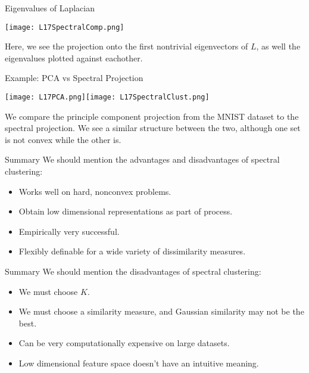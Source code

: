\documentclass[10pt, table, dvipsnames,xcdraw,handout]{beamer}
\begin{document}
\begin{frame}[fragile]{Eigenvalues of Laplacian}
  \begin{minipage}[t][0.7\textheight][t]{\textwidth}
	\centering \texttt{[image: L17SpectralComp.png]} 
  \end{minipage}
  \vfill
\begin{minipage}[t][0.3\textheight][t]{\textwidth}
Here, we see the projection onto the first nontrivial eigenvectors of $L$, as well the eigenvalues plotted against eachother. 
\end{minipage}
\end{frame}






\begin{frame}[fragile]{Example: PCA vs Spectral Projection}
  \begin{minipage}[t][0.7\textheight][t]{\textwidth}
	\centering \texttt{[image: L17PCA.png]}\texttt{[image: L17SpectralClust.png]} 
  \end{minipage}
  \vfill
\begin{minipage}[t][0.3\textheight][t]{\textwidth}
We compare the principle component projection from the MNIST dataset to the spectral projection. We see a similar structure between the two, although one set is not convex while the other is. 
\end{minipage}
\end{frame}



\begin{frame}[fragile]{Summary}
We should mention the advantages and disadvantages of spectral clustering:\pause
\begin{itemize}
\item[] Works well on hard, nonconvex problems. \pause
\item[] Obtain low dimensional representations as part of process. \pause
\item[] Empirically very successful. \pause
\item[] Flexibly definable for a wide variety of dissimilarity measures. 
\end{itemize}
\end{frame}


\begin{frame}[fragile]{Summary}
We should mention the disadvantages of spectral clustering:\pause
\begin{itemize}
\item[] We must choose $K$. \pause
\item[] We must choose a similarity measure, and Gaussian similarity may not be the best. \pause
\item[] Can be very computationally expensive on large datasets. \pause
\item[] Low dimensional feature space doesn't have an intuitive meaning.
\end{itemize}
\end{frame}
\end{document}
